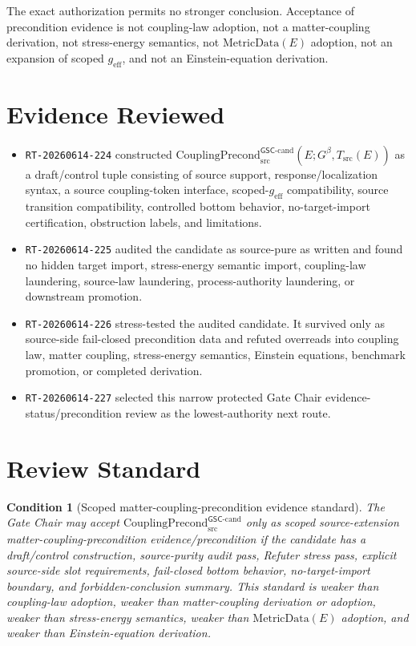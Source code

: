 \documentclass[11pt]{article}
\newcommand{\Gbeta}{G^\beta}
\newcommand{\geff}{g_{\mathrm{eff}}}
\newcommand{\CouplingPrecond}{\mathrm{CouplingPrecond}^{\mathsf{GSC}\mbox{-}\mathrm{cand}}_{\mathrm{src}}}
\newcommand{\MetricData}{\mathrm{MetricData}}
\newtheorem{condition}{Condition}
\begin{document}
The exact authorization permits no stronger conclusion. Acceptance of
precondition evidence is not coupling-law adoption, not a matter-coupling
derivation, not stress-energy semantics, not \(\MetricData(E)\) adoption, not
an expansion of scoped \(\geff\), and not an Einstein-equation derivation.

\section{Evidence Reviewed}

\begin{itemize}[leftmargin=*]
  \item \texttt{RT-20260614-224} constructed
  \(\CouplingPrecond(E;\Gbeta,T_{\mathrm{src}}(E))\) as a draft/control tuple
  consisting of source support, response/localization syntax, a source
  coupling-token interface, scoped-\(\geff\) compatibility, source transition
  compatibility, controlled bottom behavior, no-target-import certification,
  obstruction labels, and limitations.
  \item \texttt{RT-20260614-225} audited the candidate as source-pure as
  written and found no hidden target import, stress-energy semantic import,
  coupling-law laundering, source-law laundering, process-authority laundering,
  or downstream promotion.
  \item \texttt{RT-20260614-226} stress-tested the audited candidate. It
  survived only as source-side fail-closed precondition data and refuted
  overreads into coupling law, matter coupling, stress-energy semantics,
  Einstein equations, benchmark promotion, or completed derivation.
  \item \texttt{RT-20260614-227} selected this narrow protected Gate Chair
  evidence-status/precondition review as the lowest-authority next route.
\end{itemize}

\section{Review Standard}

\begin{condition}[Scoped matter-coupling-precondition evidence standard]
The Gate Chair may accept \(\CouplingPrecond\) only as scoped
source-extension matter-coupling-precondition evidence/precondition if the
candidate has a draft/control construction, source-purity audit pass, Refuter
stress pass, explicit source-side slot requirements, fail-closed bottom
behavior, no-target-import boundary, and forbidden-conclusion summary. This
standard is weaker than coupling-law adoption, weaker than matter-coupling
derivation or adoption, weaker than stress-energy semantics, weaker than
\(\MetricData(E)\) adoption, and weaker than Einstein-equation derivation.
\end{condition}
\end{document}
